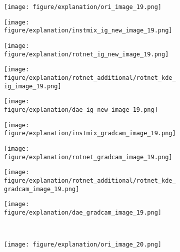 \documentclass{article} \usepackage{iclr2021_conference,times}
\begin{document}
\begin{figure}[t]
\begin{subfigure}{.11\textwidth}
  \centering
  \texttt{[image: figure/explanation/ori\_image\_19.png]}
\end{subfigure}
\hspace{-2mm}
\begin{subfigure}{.11\textwidth}
  \centering
  \texttt{[image: figure/explanation/instmix\_ig\_new\_image\_19.png]}
\end{subfigure}
\hspace{-2mm}
\begin{subfigure}{.11\textwidth}
  \centering
  \texttt{[image: figure/explanation/rotnet\_ig\_new\_image\_19.png]}
\end{subfigure}
\hspace{-2mm}
\begin{subfigure}{.11\textwidth}
  \centering
  \texttt{[image: figure/explanation/rotnet\_additional/rotnet\_kde\_ig\_image\_19.png]}
\end{subfigure}
\hspace{-2mm}
\begin{subfigure}{.11\textwidth}
  \centering
  \texttt{[image: figure/explanation/dae\_ig\_new\_image\_19.png]}
\end{subfigure}
\hspace{-2mm}
\begin{subfigure}{.11\textwidth}
  \centering
  \texttt{[image: figure/explanation/instmix\_gradcam\_image\_19.png]}
\end{subfigure}
\hspace{-2mm}
\begin{subfigure}{.11\textwidth}
  \centering
  \texttt{[image: figure/explanation/rotnet\_gradcam\_image\_19.png]}
\end{subfigure}
\hspace{-2mm}
\begin{subfigure}{.11\textwidth}
  \centering
  \texttt{[image: figure/explanation/rotnet\_additional/rotnet\_kde\_gradcam\_image\_19.png]}
\end{subfigure}
\hspace{-2mm}
\begin{subfigure}{.11\textwidth}
  \centering
  \texttt{[image: figure/explanation/dae\_gradcam\_image\_19.png]}
\end{subfigure}\\
\begin{subfigure}{.11\textwidth}
  \centering
  \texttt{[image: figure/explanation/ori\_image\_20.png]}

\end{subfigure}
\end{figure}
\end{document}
